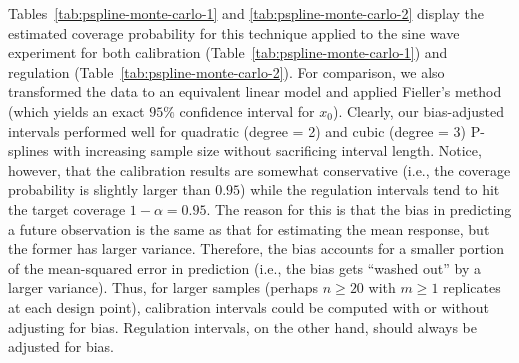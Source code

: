 \documentclass[cmfont,usenames,dvipsnames,leqno]{afit-etd}\usepackage[]{graphicx}\usepackage[]{color}
\begin{document}
Tables~\ref{tab:pspline-monte-carlo-1} and \ref{tab:pspline-monte-carlo-2} display the estimated coverage probability for this technique applied to the sine wave experiment for both calibration (Table~\ref{tab:pspline-monte-carlo-1}) and regulation (Table~\ref{tab:pspline-monte-carlo-2}). For comparison, we also transformed the data to an equivalent linear model and applied Fieller's method (which yields an exact $95\%$ confidence interval for $x_0$). Clearly, our bias-adjusted intervals performed well for quadratic (degree = 2) and cubic (degree = 3) \ac{P-spline}s with increasing sample size without sacrificing interval length. Notice, however, that the calibration results are somewhat conservative (i.e., the coverage probability is slightly larger than $0.95$) while the regulation intervals tend to hit the target coverage $1-\alpha = 0.95$. The reason for this is that the bias in predicting a future observation is the same as that for estimating the mean response, but the former has larger variance. Therefore, the bias accounts for a smaller portion of the mean-squared error in prediction (i.e., the bias gets ``washed out'' by a larger variance). Thus, for larger samples (perhaps $n \ge 20$ with $m \ge 1$ replicates at each design point), calibration intervals could be computed with or without adjusting for bias. Regulation intervals, on the other hand, should always be adjusted for bias.
\end{document}
